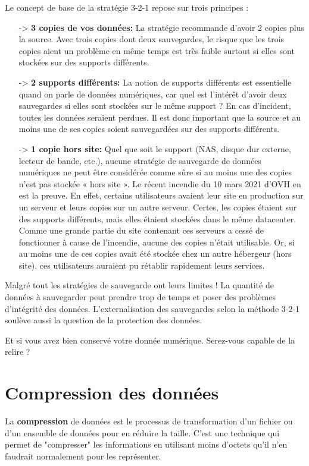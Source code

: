 \documentclass[11pt, a4paper]{book}
\begin{document}
Le concept de base de la stratégie 3-2-1 repose sur trois principes :
\begin{enumerate}
    \item[->] \textbf{{\huge 3} copies de vos données:} La stratégie recommande d’avoir 2 copies plus la source. Avec trois copies dont deux sauvegardes, le risque que les trois copies aient un problème en même temps est très faible surtout si elles sont stockées sur des supports différents.

    \item[->] \textbf{{\huge 2} supports différents:} La notion de supports différents est essentielle quand on parle de données numériques, car quel est l’intérêt d’avoir deux sauvegardes si elles sont stockées sur le même support ? En cas d’incident, toutes les données seraient perdues. Il est donc important que la source et au moins une de ses copies soient sauvegardées sur des supports différents.

    \item[->] \textbf{{\huge 1} copie hors site:} Quel que soit le support (NAS, disque dur externe, lecteur de bande, etc.), aucune stratégie de sauvegarde de données numériques ne peut être considérée comme sûre si au moins une des copies n’est pas stockée « hors site ». Le récent incendie du 10 mars 2021 d’OVH en est la preuve. En effet, certains utilisateurs avaient leur site en production sur un serveur et leurs copies sur un autre serveur. Certes, les copies étaient sur des supports différents, mais elles étaient stockées dans le même datacenter. Comme une grande partie du site contenant ces serveurs a cessé de fonctionner à cause de l’incendie, aucune des copies n’était utilisable. Or, si au moins une de ces copies avait été stockée chez un autre hébergeur (hors site), ces utilisateurs auraient pu rétablir rapidement leurs services.
\end{enumerate}

Malgré tout les stratégies de sauvegarde ont leurs limites ! La quantité de données à sauvegarder peut prendre trop de temps et poser des problèmes d’intégrité des données. L’externalisation des sauvegardes selon la méthode 3-2-1 soulève aussi la question de la protection des données. 

Et si vous avez bien conservé votre donnée numérique. Serez-vous capable de la relire ?

\section{Compression des données}
La \textbf{compression} de données est le processus de transformation d'un fichier ou d'un ensemble de données pour en réduire la taille. 
C'est une technique qui permet de "compresser" les informations en utilisant moins d'octets qu'il n'en faudrait normalement pour les représenter.
\end{document}
